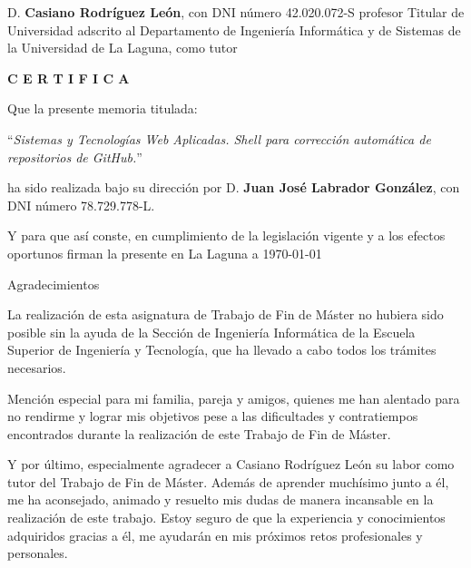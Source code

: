 \documentclass[spanish,a4paper,14pt,oneside]{extreport}
\begin{document}
\setlength{\parindent}{5mm}

\newpage
\thispagestyle{empty}

D. {\bf Casiano Rodríguez León}, con DNI número 42.020.072-S
profesor
Titular de Universidad
adscrito al Departamento
de Ingeniería Informática y de Sistemas
de la Universidad de La Laguna, como tutor

\bigskip
\bigskip
{\bf C E R T I F I C A }

\bigskip
\bigskip
\bigskip
Que la presente memoria titulada:

\bigskip
``{\it Sistemas y Tecnologías Web Aplicadas. Shell para corrección automática de repositorios de GitHub.}''

\bigskip
\bigskip
\bigskip

\noindent ha sido realizada bajo su dirección por D. {\bf Juan José Labrador González},
con DNI número 78.729.778-L.

\bigskip
\bigskip

Y para que así conste, en cumplimiento de la legislación vigente y a los efectos
oportunos firman la presente en La Laguna a \today

\newpage
\thispagestyle{empty}

{ \flushright

\begin{LARGE}
Agradecimientos
\end{LARGE}

\hspace{3mm}

\begin{large}


\hspace{3mm}
La realización de esta asignatura de Trabajo de Fin de Máster no hubiera sido posible sin 
la ayuda de la Sección de Ingeniería Informática de la Escuela Superior de Ingeniería 
y Tecnología, que ha llevado a cabo todos los trámites necesarios.
\bigskip

\hspace{3mm}
Mención especial para mi familia, pareja y amigos, quienes me han alentado para no rendirme y lograr mis objetivos pese a las dificultades y contratiempos encontrados durante la realización de este Trabajo de Fin de Máster.
\bigskip

\hspace{3mm}
Y por último, especialmente agradecer a Casiano Rodríguez León su labor como tutor del 
Trabajo de Fin de Máster. Además de aprender muchísimo junto a él, me ha aconsejado, animado y resuelto mis 
dudas de manera incansable en la realización de este trabajo. Estoy seguro de que la experiencia y conocimientos adquiridos gracias a él, me ayudarán en mis próximos retos profesionales y personales.


\end{large}

}
\end{document}

